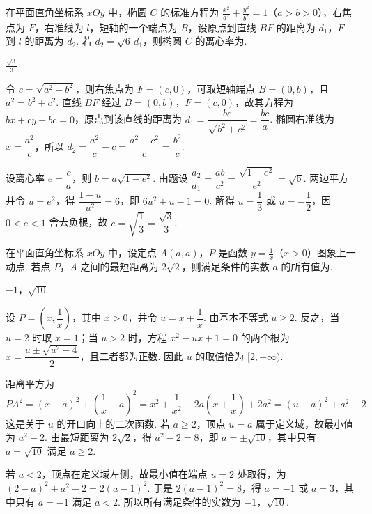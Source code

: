 \begin{problem}
在平面直角坐标系 \(xOy\) 中，椭圆 \(C\) 的标准方程为 \(\frac{x^2}{a^2}+\frac{y^2}{b^2}=1\)（\(a>b>0\)），右焦点为 \(F\)，右准线为 \(l\)，短轴的一个端点为 \(B\)，设原点到直线 \(BF\) 的距离为 \(d_1\)，\(F\) 到 \(l\) 的距离为 \(d_2\). 若 \(d_2=\sqrt6\,d_1\)，则椭圆 \(C\) 的离心率为\fillinblank{}.
\end{problem}

\begin{answer}
\(\frac{\sqrt{3}}{3}\)
\end{answer}

\begin{solution}
令 \(c=\sqrt{a^2-b^2}\)，则右焦点为 \(F=(c,0)\)，可取短轴端点 \(B=(0,b)\)，且 \(a^2=b^2+c^2\). 直线 \(BF\) 经过 \(B=(0,b)\)，\(F=(c,0)\)，故其方程为 \(bx+cy-bc=0\)，原点到该直线的距离为
\(d_1=\dfrac{bc}{\sqrt{b^2+c^2}}=\dfrac{bc}{a}\). 椭圆右准线为 \(x=\dfrac{a^2}{c}\)，所以
\(d_2=\dfrac{a^2}{c}-c=\dfrac{a^2-c^2}{c}=\dfrac{b^2}{c}\).

设离心率 \(e=\dfrac ca\)，则 \(b=a\sqrt{1-e^2}\). 由题设
\(\dfrac{d_2}{d_1}=\dfrac{ab}{c^2}=\dfrac{\sqrt{1-e^2}}{e^2}=\sqrt6\). 两边平方并令 \(u=e^2\)，得 \(\dfrac{1-u}{u^2}=6\)，即 \(6u^2+u-1=0\). 解得 \(u=\dfrac13\) 或 \(u=-\dfrac12\)，因 \(0<e<1\) 舍去负根，故 \(e=\sqrt{\dfrac13}=\dfrac{\sqrt3}{3}\).
\end{solution}

\begin{problem}
在平面直角坐标系 \(xOy\) 中，设定点 \(A(a,a)\)，\(P\) 是函数 \(y=\frac{1}{x}\)（\(x>0\)）图象上一动点. 若点 \(P\)，\(A\) 之间的最短距离为 \(2\sqrt2\)，则满足条件的实数 \(a\) 的所有值为\fillinblank{}.
\end{problem}

\begin{answer}
\(-1\)，\(\sqrt{10}\)
\end{answer}

\begin{solution}
设 \(P=\left(x,\dfrac1x\right)\)，其中 \(x>0\)，并令 \(u=x+\dfrac1x\). 由基本不等式 \(u\geqslant2\). 反之，当 \(u=2\) 时取 \(x=1\)；当 \(u>2\) 时，方程 \(x^2-ux+1=0\) 的两个根为
\(x=\dfrac{u\pm\sqrt{u^2-4}}{2}\)，且二者都为正数. 因此 \(u\) 的取值恰为 \([2,+\infty)\).

距离平方为
\[
PA^2=(x-a)^2+\left(\frac1x-a\right)^2=x^2+\frac1{x^2}-2a\left(x+\frac1x\right)+2a^2=(u-a)^2+a^2-2
\]
这是关于 \(u\) 的开口向上的二次函数. 若 \(a\geqslant2\)，顶点 \(u=a\) 属于定义域，故最小值为 \(a^2-2\). 由最短距离为 \(2\sqrt2\)，得 \(a^2-2=8\)，即 \(a=\pm\sqrt{10}\)，其中只有 \(a=\sqrt{10}\) 满足 \(a\geqslant2\).

若 \(a<2\)，顶点在定义域左侧，故最小值在端点 \(u=2\) 处取得，为 \((2-a)^2+a^2-2=2(a-1)^2\). 于是 \(2(a-1)^2=8\)，得 \(a=-1\) 或 \(a=3\)，其中只有 \(a=-1\) 满足 \(a<2\). 所以所有满足条件的实数为 \(-1\)，\(\sqrt{10}\).
\end{solution}

